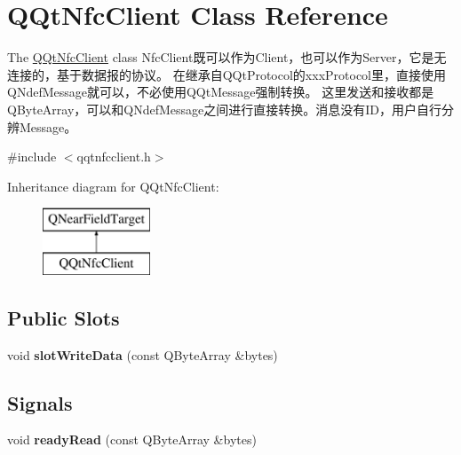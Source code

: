 \hypertarget{class_q_qt_nfc_client}{}\section{Q\+Qt\+Nfc\+Client Class Reference}
\label{class_q_qt_nfc_client}


The \mbox{\hyperlink{class_q_qt_nfc_client}{Q\+Qt\+Nfc\+Client}} class Nfc\+Client既可以作为\+Client，也可以作为\+Server，它是无连接的，基于数据报的协议。 在继承自\+Q\+Qt\+Protocol的xxx\+Protocol里，直接使用\+Q\+Ndef\+Message就可以，不必使用\+Q\+Qt\+Message强制转换。 这里发送和接收都是\+Q\+Byte\+Array，可以和\+Q\+Ndef\+Message之间进行直接转换。消息没有\+I\+D，用户自行分辨\+Message。  




{\ttfamily \#include $<$qqtnfcclient.\+h$>$}

Inheritance diagram for Q\+Qt\+Nfc\+Client\+:\begin{figure}[H]
\begin{center}
\leavevmode
\includegraphics[height=2.000000cm]{class_q_qt_nfc_client}
\end{center}
\end{figure}
\subsection*{Public Slots}
\begin{DoxyCompactItemize}
\item 
\mbox{\label{class_q_qt_nfc_client_ae325eb6570c1b76073262253e932b173}} 
void {\bfseries slot\+Write\+Data} (const Q\+Byte\+Array \&bytes)
\end{DoxyCompactItemize}
\subsection*{Signals}
\begin{DoxyCompactItemize}
\item 
\mbox{\label{class_q_qt_nfc_client_a4413122da1762c6180e78530de81d040}} 
void {\bfseries ready\+Read} (const Q\+Byte\+Array \&bytes)
\end{DoxyCompactItemize}
